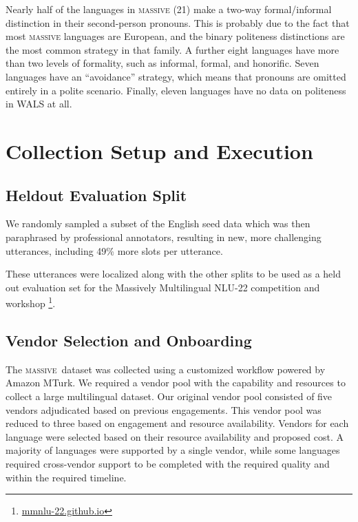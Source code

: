 \documentclass[11pt]{article}
\newif\ifreview
\newcommand{\M}{\textsc{massive}}
\begin{document}
Nearly half of the languages in \M{} (21) make a two-way formal/informal distinction in their second-person pronouns.
This is probably due to the fact that most \M{} languages are European, and the binary politeness distinctions are the most common strategy in that family.
A further eight languages have more than two levels of formality, such as informal, formal, and honorific.
Seven languages have an ``avoidance'' strategy, which means that pronouns are omitted entirely in a polite scenario.
Finally, eleven languages have no data on politeness in WALS at all.

\section{Collection Setup and Execution}

\subsection{Heldout Evaluation Split}
We randomly sampled a subset of the English seed data which was then paraphrased by professional annotators, resulting in new, more challenging utterances, including 49\% more slots per utterance. 
\ifreview
These utterances were localized along with the other splits to be used as a held out evaluation set for the [redacted] competition and workshop.
\else
These utterances were localized along with the other splits to be used as a held out evaluation set for the Massively Multilingual NLU-22 competition and workshop \footnote{\href{http://mmnlu-22.github.io}{mmnlu-22.github.io}}.
\fi

\subsection{Vendor Selection and Onboarding}

The \M~dataset was collected using a customized workflow powered by Amazon MTurk.
We required a vendor pool with the capability and resources to collect a large multilingual dataset.
Our original vendor pool consisted of five vendors adjudicated based on previous engagements.
This vendor pool was reduced to three based on engagement and resource availability.
Vendors for each language were selected based on their resource availability and proposed cost.
A majority of languages were supported by a single vendor, while some languages required cross-vendor support to be completed with the required quality and within the required timeline.
 
\end{document}
